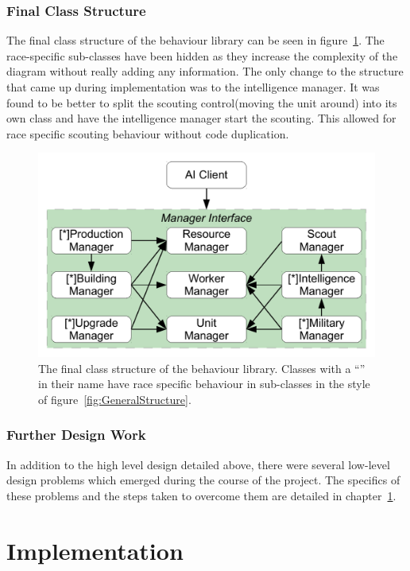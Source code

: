 \documentclass[11pt,openright,a4paper]{report}
\begin{document}
\subsection{Final Class Structure}
The final class structure of the behaviour library can be seen in figure~\ref{fig:ClassDia}. The race-specific sub-classes have been hidden as they increase the complexity of the diagram without really adding any information. The only change to the structure that came up during implementation was to the intelligence manager. It was found to be better to split the scouting control(moving the unit around) into its own class and have the intelligence manager start the scouting. This allowed for race specific scouting behaviour without code duplication.
\begin{figure}[h]
    \centering
    \includegraphics[scale=0.5]{ClassDia}
    \caption{The final class structure of the behaviour library. Classes with a ``\lbrack*\rbrack'' in their name have race specific behaviour in sub-classes in the style of figure~\ref{fig:GeneralStructure}.}
    \label{fig:ClassDia}
\end{figure}

\subsection{Further Design Work}
In addition to the high level design detailed above, there were several low-level design problems which emerged during the course of the project. The specifics of these problems and the steps taken to overcome them are detailed in chapter~\ref{Implementation}.

\chapter{Implementation}
\label{Implementation}
\end{document}
